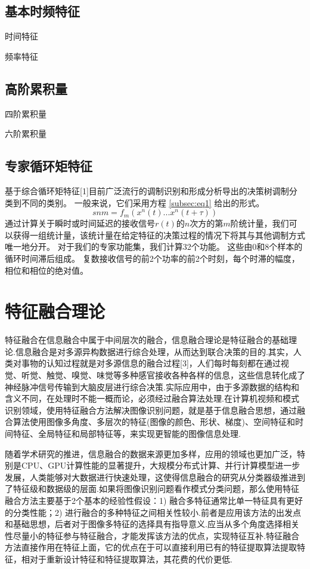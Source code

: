 \subsection{基本时频特征}
时间特征\par

频率特征\par

\subsection{高阶累积量}
四阶累积量\par

六阶累积量\par

\subsection{专家循环矩特征}
基于综合循环矩特征[1]目前广泛流行的调制识别和形成分析导出的决策树调制分类到不同的类别。 一般来说，它们采用方程 \ref{subsec:eq1} 给出的形式。
\begin{equation}
	\label{subsec:eq1}
	snm = f_{m}(x^{n}(t)...x^{n}(t + \tau))
\end{equation}
通过计算关于瞬时或时间延迟的接收信号$r(t)$的$n$次方的第$m$阶统计量，我们可以获得一组统计量，该统计量在给定特征的决策过程的情况下将其与其他调制方式唯一地分开。 对于我们的专家功能集，我们计算32个功能。 这些由0和8个样本的循环时间滞后组成。 复数接收信号的前2个功率的前2个时刻，每个时滞的幅度，相位和相位的绝对值。\par

\section{特征融合理论}
特征融合在信息融合中属于中间层次的融合，信息融合理论是特征融合的基础理论.信息融合是对多源异构数据进行综合处理，从而达到联合决策的目的.其实，人类对事物的认知过程就是对多源信息的融合过程[3]，人们每时每刻都在通过视觉、听觉、触觉、嗅觉、味觉等多种感官接收各种各样的信息，这些信息转化成了神经脉冲信号传输到大脑皮层进行综合决策.实际应用中，由于多源数据的结构和含义不同，在处理时不能一概而论，必须经过融合算法处理.在计算机视频和模式识别领域，使用特征融合方法解决图像识别问题，就是基于信息融合思想，通过融合算法使用图像多角度、多层次的特征(图像的颜色、形状、梯度)、空间特征和时间特征、全局特征和局部特征等，来实现更智能的图像信息处理.

随着学术研究的推进，信息融合的数据来源更加多样，应用的领域也更加广泛，特别是CPU、GPU计算性能的显著提升，大规模分布式计算、并行计算模型进一步发展，人类能够对大数据进行快速处理，这使得信息融合的研究从分类器级推进到了特征级和数据级的层面.如果将图像识别问题看作模式分类问题，那么使用特征融合方法主要基于2个基本的经验性假设：1) 融合多特征通常比单一特征具有更好的分类性能；2) 进行融合的多种特征之间相关性较小.前者是应用该方法的出发点和基础思想，后者对于图像多特征的选择具有指导意义.应当从多个角度选择相关性尽量小的特征参与特征融合，才能发挥该方法的优点，实现特征互补.特征融合方法直接作用在特征上面，它的优点在于可以直接利用已有的特征提取算法提取特征，相对于重新设计特征和特征提取算法，其花费的代价更低.

